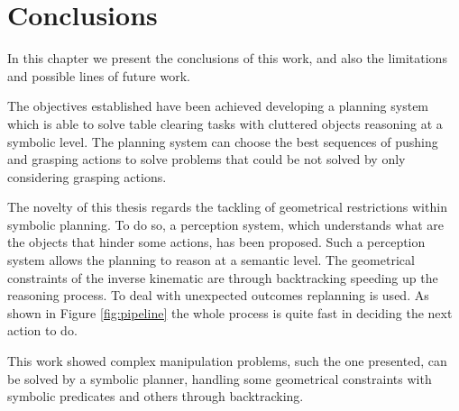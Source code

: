 \chapter{Conclusions}
\label{ch:conclusions}

In this chapter we present the conclusions of this work, and also the limitations and possible lines of future work.

The objectives established have been achieved developing a planning system which is able to solve table clearing tasks with cluttered objects reasoning at a symbolic level. The planning system can choose the best sequences of pushing and grasping actions to solve problems that could be not solved by only considering grasping actions.

The novelty of this thesis regards the tackling of geometrical restrictions within symbolic planning. To do so, a perception system, which understands what are the objects that hinder some actions, has been proposed. Such a perception system allows the planning to reason at a semantic level. The geometrical constraints of the inverse kinematic are  through backtracking speeding up the reasoning process. To deal with unexpected outcomes replanning is used. As shown in Figure \ref{fig:pipeline} the whole process is quite fast in deciding the next action to do. 

This work showed   complex manipulation problems, such the one presented, can be solved by a symbolic planner, handling some geometrical constraints with symbolic predicates and others through backtracking.


